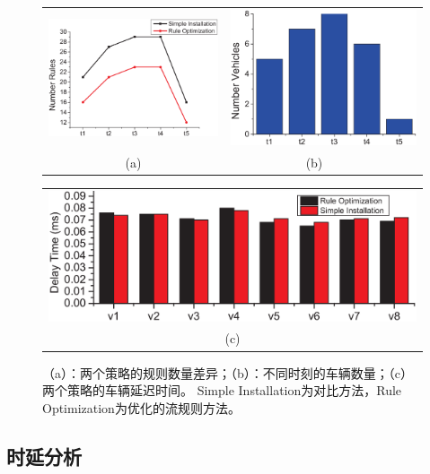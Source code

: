 \begin{figure} [t]
\begin{center}
\begin{tabular}{cc}
\includegraphics[width=0.5\columnwidth]{figures/fig-e-num-1.eps}&
\hspace {-0.2in}
\includegraphics[width=0.5\columnwidth]{figures/fig-e-num-2.eps} \\
(a) & (b)~~~
\end{tabular}
\begin{tabular}{c}
\includegraphics[width=0.9\columnwidth]{figures/fig-e-8bar-30.eps} \\
(c)
\end{tabular}
\caption{（a）：两个策略的规则数量差异；（b）：不同时刻的车辆数量；（c）两个策略的车辆延迟时间。 Simple Installation为对比方法，Rule Optimization为优化的流规则方法。} \label{fig8b}
  \end{center}
\end{figure}

\subsection{时延分析}


